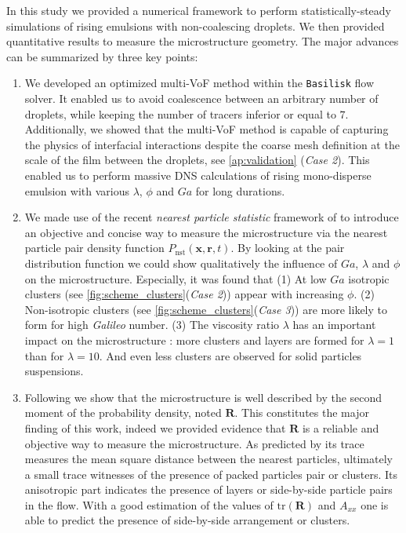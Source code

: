 
In this study we provided a numerical framework to perform statistically-steady simulations of rising emulsions with non-coalescing droplets. 
We then provided quantitative results to measure the microstructure geometry.
The major advances can be summarized by three key points:
\begin{enumerate}
    \item We developed an optimized multi-VoF method within the \texttt{Basilisk} flow solver. 
    It enabled us to avoid coalescence between an arbitrary number of droplets, while keeping the number of tracers inferior or equal to $7$. 
    Additionally, we showed that the multi-VoF method is capable of capturing the physics of interfacial interactions despite the coarse mesh definition at the scale of the film between the droplets, see \ref{ap:validation} (\textit{Case 2}). 
    This enabled us to perform massive DNS calculations of rising mono-disperse emulsion with various $\lambda$, $\phi$ and $Ga$ for long durations.
    \item We made use of the recent \textit{nearest particle statistic} framework of \citet{zhang2023evolution} to introduce an objective and concise way to measure the microstructure via the nearest particle pair density function $P_\text{nst}(\textbf{x},\textbf{r},t)$. 
    By looking at the pair distribution function we could show qualitatively the influence of $Ga$, $\lambda$ and $\phi$ on the microstructure.
    Especially, it was found that 
    (1) At low $Ga$ isotropic clusters (see \ref{fig:scheme_clusters}(\textit{Case 2})) appear with increasing $\phi$. 
    (2) Non-isotropic clusters (see \ref{fig:scheme_clusters}(\textit{Case 3})) are more likely to form for high \textit{Galileo} number.
    (3) The viscosity ratio $\lambda$ has an important impact on the microstructure : more clusters and layers are formed for $\lambda = 1$ than for $\lambda = 10$. 
    And even less clusters are observed for solid particles suspensions. 
    \item Following \citet{zhang2023evolution} we show that the microstructure is well described by the second moment of the probability density, noted $\textbf{R}$. 
    This constitutes the major finding of this work, indeed we provided evidence that $\textbf{R}$ is a reliable and objective way to measure the microstructure.
    As predicted by \citet{zhang2023evolution} its trace measures the mean square distance between the nearest particles, ultimately a small trace witnesses of the presence of packed particles pair or clusters.
    Its anisotropic part indicates the presence of layers or side-by-side particle pairs in the flow. 
    With a good estimation of the values of $\text{tr}(\textbf{R})$ and $A_{xx}$ one is able to predict the presence of side-by-side arrangement or clusters.
\end{enumerate}

